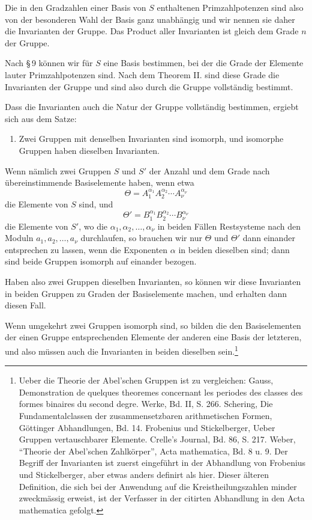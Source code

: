 \documentclass[11pt]{article}
\begin{document}
Die in den Gradzahlen einer Basis von $S$ enthaltenen Primzahlpotenzen sind also von der besonderen Wahl der Basis ganz unabhängig und wir nennen sie daher die Invarianten der Gruppe. Das Product aller Invarianten ist gleich dem Grade $n$ der Gruppe.

Nach \S\,9 können wir für $S$ eine Basis bestimmen, bei der die Grade der Elemente lauter Primzahlpotenzen sind. Nach dem Theorem II. sind diese Grade die Invarianten der Gruppe und sind also durch die Gruppe vollständig bestimmt.

Dass die Invarianten auch die Natur der Gruppe vollständig bestimmen, ergiebt sich aus dem Satze:

\begin{enumerate}[label=\Roman*.,start=3]
\item Zwei Gruppen mit denselben Invarianten sind isomorph, und isomorphe Gruppen haben dieselben Invarianten.
\end{enumerate}

Wenn nämlich zwei Gruppen $S$ und $S'$ der Anzahl und dem Grade nach übereinstimmende Basiselemente haben, wenn etwa
\[
\Theta=A_1^{\alpha_1}A_2^{\alpha_2}\cdots A_\nu^{\alpha_\nu}
\]
die Elemente von $S$ sind, und
\[
\Theta'=B_1^{\alpha_1}B_2^{\alpha_2}\cdots B_\nu^{\alpha_\nu}
\]
die Elemente von $S'$, wo die $\alpha_1,\alpha_2,\ldots,\alpha_\nu$ in beiden Fällen Restsysteme nach den Moduln $a_1,a_2,\ldots,a_\nu$ durchlaufen, so brauchen wir nur $\Theta$ und $\Theta'$ dann einander entsprechen zu lassen, wenn die Exponenten $\alpha$ in beiden dieselben sind; dann sind beide Gruppen isomorph auf einander bezogen.

Haben also zwei Gruppen dieselben Invarianten, so können wir diese Invarianten in beiden Gruppen zu Graden der Basiselemente machen, und erhalten dann diesen Fall.

Wenn umgekehrt zwei Gruppen isomorph sind, so bilden die den Basiselementen der einen Gruppe entsprechenden Elemente der anderen eine Basis der letzteren, und also müssen auch die Invarianten in beiden dieselben sein.\footnote{Ueber die Theorie der Abel'schen Gruppen ist zu vergleichen: Gauss, Demonstration de quelques theoremes concernant les periodes des classes des formes binaires du second degre. Werke, Bd. II, S. 266. Schering, Die Fundamentalclassen der zusammensetzbaren arithmetischen Formen, Göttinger Abhandlungen, Bd. 14. Frobenius und Stickelberger, Ueber Gruppen vertauschbarer Elemente. Crelle's Journal, Bd. 86, S. 217. Weber, ``Theorie der Abel'schen Zahlkörper'', Acta mathematica, Bd. 8 u. 9. Der Begriff der Invarianten ist zuerst eingeführt in der Abhandlung von Frobenius und Stickelberger, aber etwas anders definirt als hier. Dieser älteren Definition, die sich bei der Anwendung auf die Kreistheilungszahlen minder zweckmässig erweist, ist der Verfasser in der citirten Abhandlung in den Acta mathematica gefolgt.}
\end{document}
